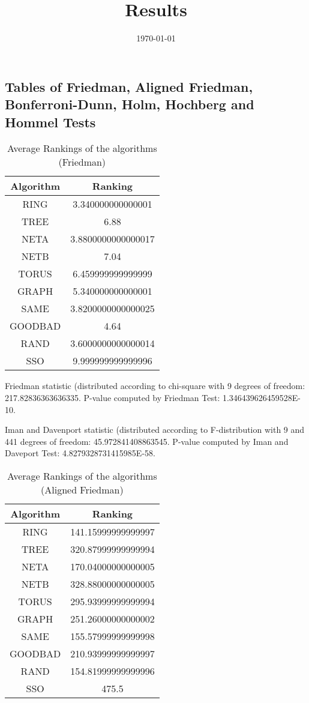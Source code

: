 \documentclass[a4paper,10pt]{article}
\title{Results}
\author{}
\date{\today}
\begin{document}
\begin{landscape}
\oddsidemargin 0in \topmargin 0in\maketitle
\section{Tables of Friedman, Aligned Friedman, Bonferroni-Dunn, Holm, Hochberg and Hommel Tests}
\begin{table}[!htp]
\centering
\caption{Average Rankings of the algorithms (Friedman)
}\begin{tabular}{c|c}
Algorithm&Ranking\\
\hline
 RING&3.340000000000001\\
 TREE&6.88\\
 NETA&3.8800000000000017\\
 NETB&7.04\\
 TORUS&6.459999999999999\\
 GRAPH&5.340000000000001\\
 SAME&3.8200000000000025\\
 GOODBAD&4.64\\
 RAND&3.6000000000000014\\
 SSO&9.999999999999996\\
\end{tabular}
\end{table}


Friedman statistic (distributed according to chi-square with 9 degrees of freedom: 217.82836363636335. 
P-value computed by Friedman Test: 1.346439626459528E-10.\newline

Iman and Davenport statistic (distributed according to F-distribution with 9 and 441 degrees of freedom: 45.972841408863545. 
P-value computed by Iman and Daveport Test: 4.8279328731415985E-58.\newline


\newpage

\begin{table}[!htp]
\centering
\caption{Average Rankings of the algorithms (Aligned Friedman)
}\begin{tabular}{c|c}
Algorithm&Ranking\\
\hline
 RING&141.15999999999997\\
 TREE&320.87999999999994\\
 NETA&170.04000000000005\\
 NETB&328.88000000000005\\
 TORUS&295.93999999999994\\
 GRAPH&251.26000000000002\\
 SAME&155.57999999999998\\
 GOODBAD&210.93999999999997\\
 RAND&154.81999999999996\\
 SSO&475.5\\
\end{tabular}
\end{table}



\end{landscape}
\end{document}
